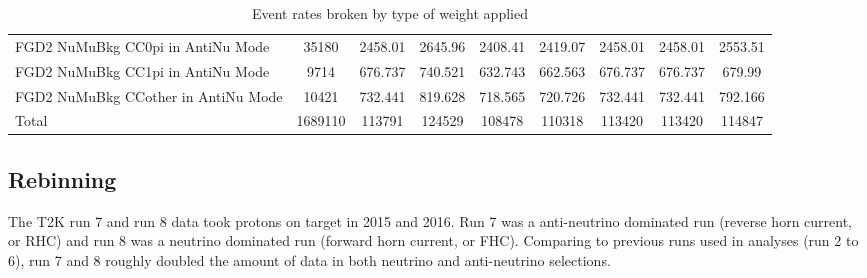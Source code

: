 \begin{sidewaystable}
{\begin{tabular}{| l | c | c | c | c | c | c | c | c |}
      FGD2 NuMuBkg CC0pi in AntiNu Mode & 35180 & 2458.01 & 2645.96 & 2408.41 & 2419.07 & 2458.01 & 2458.01 & 2553.51 \\
      FGD2 NuMuBkg CC1pi in AntiNu Mode & 9714 & 676.737 & 740.521 & 632.743 & 662.563 & 676.737 & 676.737 & 679.99 \\
      FGD2 NuMuBkg CCother in AntiNu Mode & 10421 & 732.441 & 819.628 & 718.565 & 720.726 & 732.441 & 732.441 & 792.166 \\
      \hline
      Total & 1689110 & 113791 & 124529 & 108478 & 110318 & 113420 & 113420 & 114847 \\
      

    \end{tabular}
        }
        \caption{Event rates broken by type of weight applied}
  \label{tab:detailed_eventrate_2018}
\end{sidewaystable}




\subsection{Rebinning}
The T2K run 7 and run 8 data took  protons on target in 2015 and 2016. Run 7 was a anti-neutrino dominated run (reverse horn current, or RHC) and run 8 was a neutrino dominated run (forward horn current, or FHC). Comparing to previous runs used in analyses (run 2 to 6), run 7 and 8 roughly doubled the amount of data in both neutrino and anti-neutrino selections. 

